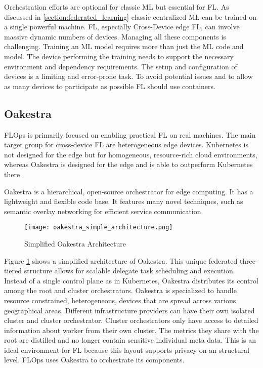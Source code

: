 Orchestration efforts are optional for classic ML but essential for FL.
As discussed in \ref{section:federated_learning} classic centralized ML can be trained on a single powerful machine.
FL, especially Cross-Device edge FL, can involve massive dynamic numbers of devices.
Managing all these components is challenging.
Training an ML model requires more than just the ML code and model.
The device performing the training needs to support the necessary environment and dependency requirements.
The setup and configuration of devices is a limiting and error-prone task.
To avoid potential issues and to allow as many devices to participate as possible FL should use containers. 


\subsection{Oakestra}

FLOps is primarily focused on enabling practical FL on real machines.
The main target group for cross-device FL are heterogeneous edge devices.
Kubernetes is not designed for the edge but for homogeneous, resource-rich cloud environments, whereas Oakestra is designed for the edge and is able to outperform Kubernetes there \cite{paper:oakestra_usenix}.

Oakestra is a hierarchical, open-source orchestrator for edge computing.
It has a lightweight and flexible code base.
It features many novel techniques, such as semantic overlay networking for efficient service communication.

\begin{figure}[!ht]
    \begin{adjustwidth}{-0.1\paperwidth}{-0.1\paperwidth}
        \centering
        \texttt{[image: oakestra\_simple\_architecture.png]}
        \caption{Simplified Oakestra Architecture}
        \label{fig:simple_oakestra_architecture}
    \end{adjustwidth}
\end{figure}

Figure \ref{fig:simple_oakestra_architecture} shows a simplified architecture of Oakestra.
This unique federated three-tiered structure allows for scalable delegate task scheduling and execution.
Instead of a single control plane as in Kubernetes, Oakestra distributes its control among
the root and cluster orchestrators.
Oakestra is specialized to handle resource constrained, heterogeneous, devices that are spread across various geographical areas.
Different infrastructure providers can have their own isolated cluster and cluster orchestrator.
Cluster orchestrators only have access to detailed information about worker from their own cluster.
The metrics they share with the root are distilled and no longer contain sensitive individual meta data.
This is an ideal environment for FL because this layout supports privacy on an structural level.
FLOps uses Oakestra to orchestrate its components.

